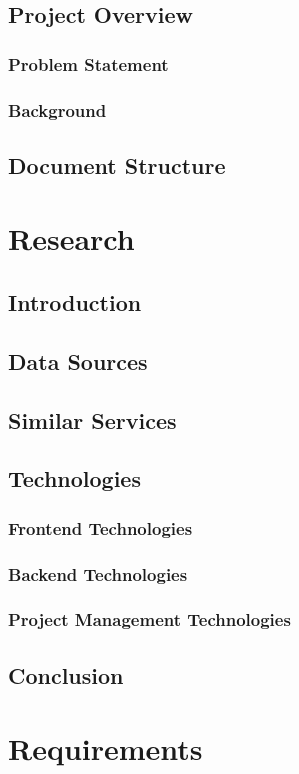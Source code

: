 \documentclass[a4paper,11pt]{report}
\begin{document}
\section{Project Overview}
\subsection{Problem Statement}
\subsection{Background}
\section{Document Structure}

\chapter{Research}
\section{Introduction}
\section{Data Sources}
\section{Similar Services}
\section{Technologies}
\subsection{Frontend Technologies}
\subsection{Backend Technologies}
\subsection{Project Management Technologies}
\section{Conclusion}

\chapter{Requirements}
\end{document}
